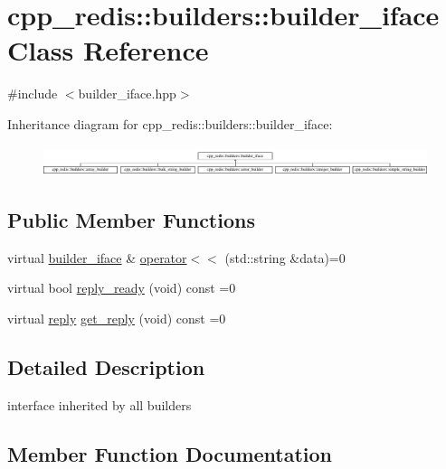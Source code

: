 \hypertarget{classcpp__redis_1_1builders_1_1builder__iface}{}\section{cpp\+\_\+redis\+:\+:builders\+:\+:builder\+\_\+iface Class Reference}
\label{classcpp__redis_1_1builders_1_1builder__iface}


{\ttfamily \#include $<$builder\+\_\+iface.\+hpp$>$}

Inheritance diagram for cpp\+\_\+redis\+:\+:builders\+:\+:builder\+\_\+iface\+:\begin{figure}[H]
\begin{center}
\leavevmode
\includegraphics[height=0.888889cm]{classcpp__redis_1_1builders_1_1builder__iface}
\end{center}
\end{figure}
\subsection*{Public Member Functions}
\begin{DoxyCompactItemize}
\item 
virtual \hyperlink{classcpp__redis_1_1builders_1_1builder__iface}{builder\+\_\+iface} \& \hyperlink{classcpp__redis_1_1builders_1_1builder__iface_a9892bbc9c887c31c2742dad4476e2fa6}{operator$<$$<$} (std\+::string \&data)=0
\item 
virtual bool \hyperlink{classcpp__redis_1_1builders_1_1builder__iface_a40db9a31d4ea1771777e74146d31e12d}{reply\+\_\+ready} (void) const =0
\item 
virtual \hyperlink{classcpp__redis_1_1reply}{reply} \hyperlink{classcpp__redis_1_1builders_1_1builder__iface_afd2ff2c2371c2a486116543b638b9413}{get\+\_\+reply} (void) const =0
\end{DoxyCompactItemize}


\subsection{Detailed Description}
interface inherited by all builders 

\subsection{Member Function Documentation}
\mbox{\label{classcpp__redis_1_1builders_1_1builder__iface_afd2ff2c2371c2a486116543b638b9413}} 
